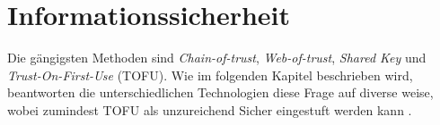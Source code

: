 \chapter{Informationssicherheit}
\label{chap:itsecurity}




Die gängigsten Methoden sind \textit{Chain-of-trust}, \textit{Web-of-trust}, \textit{Shared Key} und \textit{Trust-On-First-Use} (TOFU). Wie im folgenden Kapitel beschrieben wird, beantworten die unterschiedlichen Technologien diese Frage auf diverse weise, wobei zumindest TOFU als unzureichend Sicher eingestuft werden kann \cite{Wendlandt2008}.